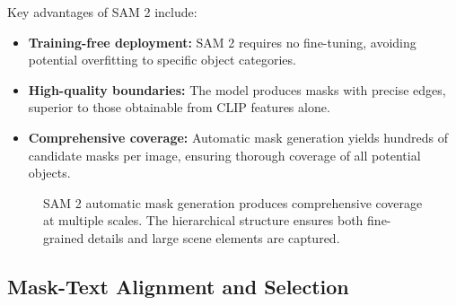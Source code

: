 Key advantages of SAM 2 include:
\begin{itemize}
    \item \textbf{Training-free deployment:} SAM 2 requires no fine-tuning, avoiding potential overfitting to specific object categories.
    \item \textbf{High-quality boundaries:} The model produces masks with precise edges, superior to those obtainable from CLIP features alone.
    \item \textbf{Comprehensive coverage:} Automatic mask generation yields hundreds of candidate masks per image, ensuring thorough coverage of all potential objects.
\end{itemize}

\begin{figure}[h]
\centering
{}
\caption{SAM 2 automatic mask generation produces comprehensive coverage at multiple scales. The hierarchical structure ensures both fine-grained details and large scene elements are captured.}
\label{fig:sam2_masks}
\end{figure}

\subsection{Mask-Text Alignment and Selection}


